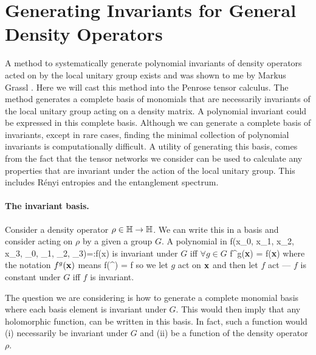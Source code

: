 \section{Generating Invariants for General Density Operators}
A method to systematically generate polynomial invariants of density
operators acted on by the local unitary group exists and was shown to
me by Markus Grassl \cite{entinv2}.  Here we will cast this method into the Penrose tensor calculus.  The method generates a complete basis of monomials that are necessarily
invariants of the local unitary group acting on a density matrix.  A polynomial invariant 
could be expressed in this complete basis.  Although we can generate a complete basis of invariants, except in rare cases, finding the minimal collection of polynomial invariants is computationally difficult.  A utility of generating this basis, comes from the fact that the tensor networks we consider can be used to calculate any properties that are invariant under the action of the local unitary group.  This includes R\'{e}nyi entropies and the entanglement spectrum.  

\paragraph{The invariant basis.}  Consider a density 
operator $\rho\in {\mathbb H}\rightarrow {\mathbb H}$.  We can write 
this in a basis and consider acting on $\rho$ by a given a group $G$.  
A polynomial in 
\be 
f(x_0, x_1, x_2, x_3, _0, _1, _2, _3)=:f(\1x) 
\ee 
is invariant under $G$ iff $\forall g\in G$ 
\be 
f^g(\textbf x) = f(\textbf x) 
\ee 
where the notation $f^g(\textbf x)$ means 
\be 
f\small{\left(^\top\right)} = f
\ee 
so we let $g$ act on $\textbf x$ and then let $f$ act --- $f$ is constant under $G$ iff $f$ is invariant.  

The question we are considering is how to generate 
a complete monomial basis where each basis element is invariant under $G$.  This would then imply that any holomorphic function, can be written in this basis.  In fact, such a function would (i) necessarily be invariant under $G$ and (ii) be a function of the density operator $\rho$.    


